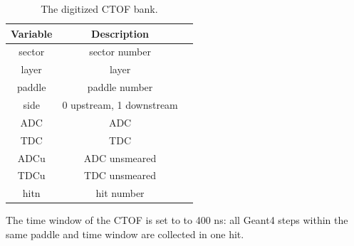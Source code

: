 \begin{table}[h]
	\begin{center}
		\begin{tabular}{| c | c | c |}
			\hline \hline
			Variable         & Description   \\
			\hline
              sector  &                             sector number   \\
               layer  &                                     layer   \\
              paddle  &                             paddle number   \\
                side  &                  0 upstream, 1 downstream   \\
                 ADC  &                                       ADC   \\
                 TDC  &                                       TDC   \\
                ADCu  &                             ADC unsmeared   \\
                TDCu  &                             TDC unsmeared   \\
                hitn  &                                hit number   \\
			\hline \hline
		\end{tabular}
	\end{center}
	\caption{The digitized CTOF bank.}\label{tab:ctofBank}
\end{table}

The time window of the CTOF is set to to 400 ns: all Geant4 steps within the same paddle and time window are collected in one hit.


